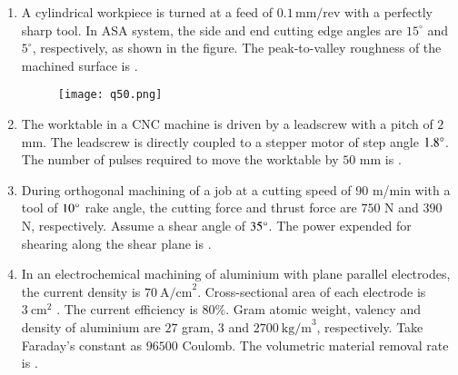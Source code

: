 \documentclass[journal,12pt,onecolumn]{IEEEtran}
\theoremstyle{remark}
\begin{document}
\begin{enumerate}
\hfill{}

\item A cylindrical workpiece is turned at a feed of $0.1 \,\text{mm/rev}$ with a perfectly sharp tool. 
In ASA system, the side and end cutting edge angles are $15^\circ$ and $5^\circ$, respectively, 
as shown in the figure. 
The peak-to-valley roughness of the machined surface is \underline{\hspace{2cm}}.

\begin{figure}[H]
    \centering
    \texttt{[image: q50.png]}
    \caption*{}
    \label{fig:q50}
\end{figure}

\hfill{}

\item The worktable in a CNC machine is driven by a leadscrew with a pitch of $2$ mm. The leadscrew is directly coupled to a stepper motor of step angle $1.8\degree$. The number of pulses required to move the worktable by $50$ mm is \underline{\hspace{2cm}}.

\hfill{}

\item During orthogonal machining of a job at a cutting speed of $90$ m/min with a tool of $10\degree$ rake angle, the cutting force and thrust force are $750$ N and $390$ N, respectively. Assume a shear angle of $35\degree$. The power  expended for shearing along the shear plane is \underline{\hspace{2cm}}.

\hfill{}

\item In an electrochemical machining of aluminium with plane parallel electrodes, the current density is $70~\text{A/cm}^2$. Cross-sectional area of each electrode is $3~\text{cm}^2$ .
 The current efficiency  is $80\%$. Gram atomic weight, valency and density of aluminium are $27$ gram, $3$ and $2700~\text{kg/m}^3$, respectively. Take Faraday's constant as $96500$ Coulomb. The volumetric material removal rate  is \underline{\hspace{2cm}}.

\hfill{}


\end{enumerate}
\end{document}
